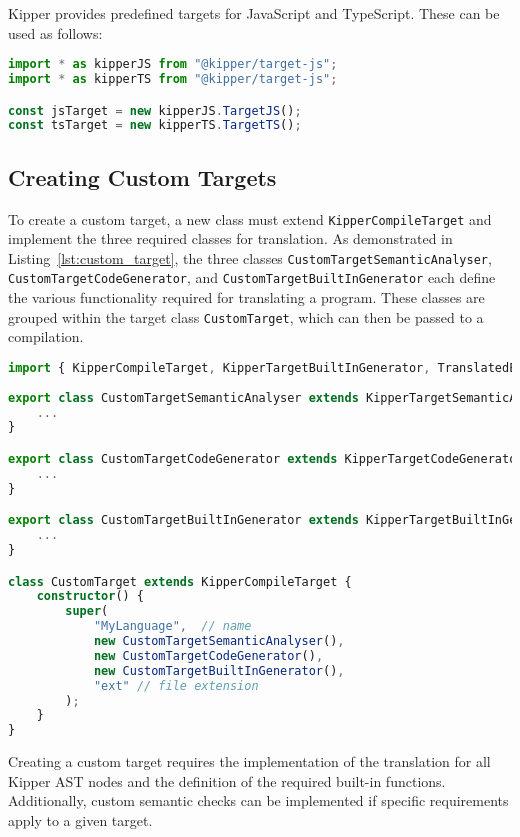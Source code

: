 Kipper provides predefined targets for JavaScript and TypeScript. These can be used as follows:

\begin{lstlisting}[language=Typescript, caption=Using Compilation Targets, label=lst:using_targets]
import * as kipperJS from "@kipper/target-js";
import * as kipperTS from "@kipper/target-js";

const jsTarget = new kipperJS.TargetJS();
const tsTarget = new kipperTS.TargetTS();
\end{lstlisting}

\subsection{Creating Custom Targets}
\label{subsec:custom_targets}

To create a custom target, a new class must extend \lstinline|KipperCompileTarget| and implement the three required classes for translation. As demonstrated in Listing~\ref{lst:custom_target}, the three classes \lstinline|CustomTargetSemanticAnalyser|, \lstinline|CustomTargetCodeGenerator|, and \lstinline|CustomTargetBuiltInGenerator| each define the various functionality required for translating a program. These classes are grouped within the target class \lstinline|CustomTarget|, which can then be passed to a compilation.

\begin{lstlisting}[language=Typescript, caption=Creating a Custom Compilation Target, label=lst:custom_target]
import { KipperCompileTarget, KipperTargetBuiltInGenerator, TranslatedExpression } from "@kipper/core";
	
export class CustomTargetSemanticAnalyser extends KipperTargetSemanticAnalyser {
	...
}

export class CustomTargetCodeGenerator extends KipperTargetCodeGenerator {
	...
}

export class CustomTargetBuiltInGenerator extends KipperTargetBuiltInGenerator {
	...
}

class CustomTarget extends KipperCompileTarget {
	constructor() {
		super(
			"MyLanguage",  // name
			new CustomTargetSemanticAnalyser(), 
			new CustomTargetCodeGenerator(), 
			new CustomTargetBuiltInGenerator(), 
			"ext" // file extension
		);
	}
}
\end{lstlisting}

Creating a custom target requires the implementation of the translation for all Kipper AST nodes and the definition of the required built-in functions. Additionally, custom semantic checks can be implemented if specific requirements apply to a given target.


